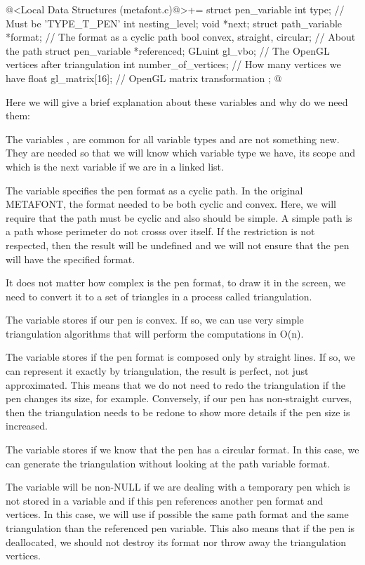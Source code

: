 \iniciocodigo
@<Local Data Structures (metafont.c)@>+=
struct pen_variable{
  int type; // Must be 'TYPE_T_PEN'
  int nesting_level;
  void *next;
  struct path_variable *format; // The format as a cyclic path
  bool convex, straight, circular; // About the path
  struct pen_variable *referenced;
  GLuint gl_vbo; // The OpenGL vertices after triangulation
  int number_of_vertices; // How many vertices we have
  float gl_matrix[16]; // OpenGL matrix transformation
};
@
\fimcodigo

Here we will give a brief explanation about these variables and why do
we need them:

The variables , 
are  common for all variable types and are not
something new. They are needed so that we will know which variable
type we have, its scope and which is the next variable if we are in a
linked list.

The variable  specifies the pen format as a cyclic
path. In the original METAFONT, the format needed to be both cyclic
and convex. Here, we will require that the path must be cyclic and
also should be simple. A simple path is a path whose perimeter do not
crosss over itself. If the restriction is not respected, then the
result will be undefined and we will not ensure that the pen will have
the specified format.

It does not matter how complex is the pen format, to draw it in the
screen, we need to convert it to a set of triangles in a process
called triangulation.

The variable  stores if our pen is convex. If so,
we can use very simple triangulation algorithms that will perform the
computations in O(n).

The variable  stores if the pen format is
composed only by straight lines. If so, we can represent it exactly by
triangulation, the result is perfect, not just approximated. This
means that we do not need to redo the triangulation if the pen changes
its size, for example. Conversely, if our pen has non-straight curves,
then the triangulation needs to be redone to show more details if the
pen size is increased. 

The variable  stores if we know that the pen has
a circular format. In this case, we can generate the triangulation
without looking at the path variable format.

The variable  will be non-NULL if we are
dealing with a temporary pen which is not stored in a variable and if
this pen references another pen format and vertices. In this case, we
will use if possible the same path format and the same triangulation
than the referenced pen variable. This also means that if the pen is
deallocated, we should not destroy its format nor throw away the
triangulation vertices.

